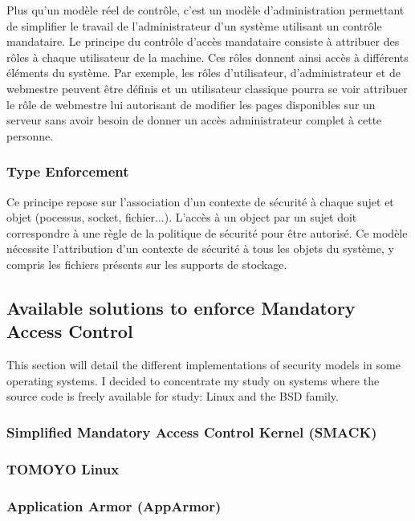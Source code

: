 \documentclass[pdftex,a4paper,titlepage,11pt]{article}
\begin{document}
Plus qu'un modèle réel de contrôle, c'est un modèle d'administration permettant
de simplifier le travail de l'administrateur d'un système utilisant un contrôle
mandataire. Le principe du contrôle d'accès mandataire consiste à attribuer des
rôles à chaque utilisateur de la machine. Ces rôles donnent ainsi accès à
différents éléments du système. Par exemple, les rôles d'utilisateur,
d'administrateur et de webmestre peuvent être définis et un utilisateur
classique pourra se voir attribuer le rôle de webmestre lui autorisant de
modifier les pages disponibles sur un serveur sans avoir besoin de donner un
accès administrateur complet à cette personne.

\subsubsection{Type Enforcement}

Ce principe repose sur l'association d'un contexte de sécurité à chaque sujet et
objet (pocessus, socket, fichier...). L'accès à un object par un sujet doit
correspondre à une règle de la politique de sécurité pour être autorisé. Ce
modèle nécessite l'attribution d'un contexte de sécurité à tous les objets du
système, y compris les fichiers présents sur les supports de stockage.

\subsection{Available solutions to enforce Mandatory Access Control}

This section will detail the different implementations of security models in
some operating systems. I decided to concentrate my study on systems where the
source code is freely available for study: Linux and the BSD family.

\subsubsection{Simplified Mandatory Access Control Kernel (SMACK)}

\subsubsection{TOMOYO Linux}

\subsubsection{Application Armor (AppArmor)}
\end{document}
